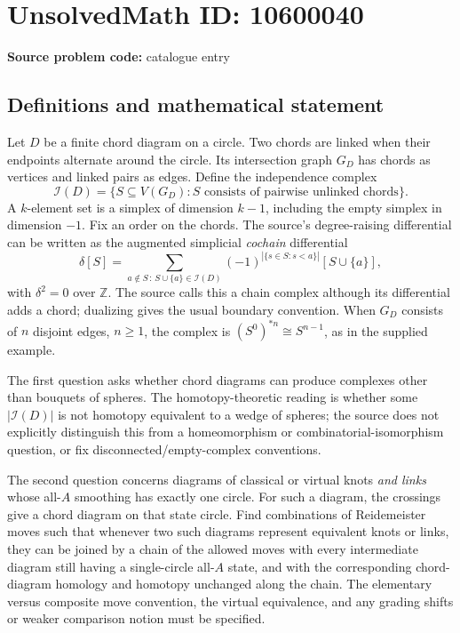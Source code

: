 \documentclass[11pt]{article}
\newcommand{\Z}{\mathbb{Z}}
\begin{document}
\section*{UnsolvedMath ID: 10600040}
\textbf{Source problem code:} catalogue entry
\subsection{Definitions and mathematical statement}
Let \(D\) be a finite chord diagram on a circle. Two chords are linked when their endpoints alternate around the circle. Its intersection graph \(G_D\) has chords as vertices and linked pairs as edges. Define the independence complex
\[
 \mathcal I(D)=\{S\subseteq V(G_D):S\text{ consists of pairwise unlinked chords}\}.
\]
A \(k\)-element set is a simplex of dimension \(k-1\), including the empty simplex in dimension \(-1\). Fix an order on the chords. The source's degree-raising differential can be written as the augmented simplicial \emph{cochain} differential
\[
 \delta[S]=\sum_{a\notin S\, :\,S\cup\{a\}\in\mathcal I(D)}
 (-1)^{|\{s\in S:s<a\}|}[S\cup\{a\}],
\]
with \(\delta^2=0\) over \(\Z\). The source calls this a chain complex although its differential adds a chord; dualizing gives the usual boundary convention. When \(G_D\) consists of \(n\) disjoint edges, \(n\geq1\), the complex is \((S^0)^{*n}\cong S^{n-1}\), as in the supplied example.

The first question asks whether chord diagrams can produce complexes other than bouquets of spheres. The homotopy-theoretic reading is whether some \(|\mathcal I(D)|\) is not homotopy equivalent to a wedge of spheres; the source does not explicitly distinguish this from a homeomorphism or combinatorial-isomorphism question, or fix disconnected/empty-complex conventions.

The second question concerns diagrams of classical or virtual knots \emph{and links} whose all-\(A\) smoothing has exactly one circle. For such a diagram, the crossings give a chord diagram on that state circle. Find combinations of Reidemeister moves such that whenever two such diagrams represent equivalent knots or links, they can be joined by a chain of the allowed moves with every intermediate diagram still having a single-circle all-\(A\) state, and with the corresponding chord-diagram homology and homotopy unchanged along the chain. The elementary versus composite move convention, the virtual equivalence, and any grading shifts or weaker comparison notion must be specified.
\end{document}
